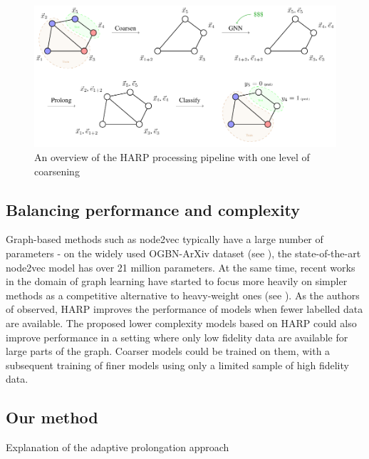 \begin{figure}
  \centering
  \includegraphics[width=\linewidth]{images/harp-overview/harp-overview.pdf}
  \caption{An overview of the HARP processing pipeline with one level of coarsening}
  \label{fig:harp-overview}
\end{figure}

\subsection{Balancing performance and complexity}

Graph-based methods such as node2vec typically have a large number of parameters - on the widely used OGBN-ArXiv dataset (see \cite{hu_open_2021}), the state-of-the-art node2vec model has over 21 million parameters. At the same time, recent works in the domain of graph learning have started to focus more heavily on simpler methods as a competitive alternative to heavy-weight ones (see \cite{frasca_sign_2020,huang_combining_2020,salha_keep_2019,zhang_eigen-gnn_2020}). As the authors of \cite{chen_harp_2018} observed, HARP improves the performance of models when fewer labelled data are available. The proposed lower complexity models based on HARP could also improve performance in a setting where only low fidelity data are available for large parts of the graph. Coarser models could be trained on them, with a subsequent training of finer models using only a limited sample of high fidelity data.

\subsection{Our method}
Explanation of the adaptive prolongation approach
